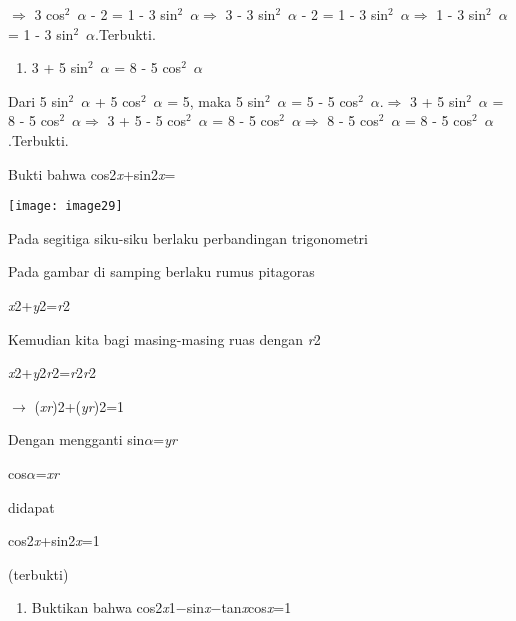 \documentclass[11pt,fleqn]{book} %
\begin{document}
\begin{myEnumerate}
\begin{itemize}
\noindent $\mathrm{\Rightarrow }$ 3 cos${}^{2}$~$\alpha$ - 2 = 1 - 3 sin${}^{2}$~$\alpha$$\mathrm{\Rightarrow }$ 3 - 3 sin${}^{2}$~$\alpha$ - 2 = 1 - 3 sin${}^{2}$~$\alpha$$\mathrm{\Rightarrow }$ 1 - 3 sin${}^{2}$~$\alpha$ = 1 - 3 sin${}^{2}$~$\alpha$.Terbukti.

\begin{enumerate}
\item  3 + 5 sin${}^{2}$~$\alpha$ = 8 - 5 cos${}^{2}$~$\alpha$
\end{enumerate}

\noindent Dari 5 sin${}^{2}$~$\alpha$ + 5 cos${}^{2}$~$\alpha$ = 5, maka 5 sin${}^{2}$~$\alpha$ = 5 - 5 cos${}^{2}$~$\alpha$.$\mathrm{\Rightarrow }$ 3 + 5 sin${}^{2}$~$\alpha$ = 8 - 5 cos${}^{2}$~$\alpha$$\mathrm{\Rightarrow }$ 3 + 5 - 5 cos${}^{2}$~$\alpha$ = 8 - 5 cos${}^{2}$~$\alpha$$\mathrm{\Rightarrow }$ 8 - 5 cos${}^{2}$~$\alpha$ = 8 - 5 cos${}^{2}$~$\alpha$.Terbukti.~

\noindent \textbf{}

\noindent Bukti bahwa cos2\textit{x}+sin2\textit{x}=


\noindent \texttt{[image: image29]}

\noindent Pada segitiga siku-siku berlaku perbandingan trigonometri 

\noindent Pada gambar di samping berlaku rumus pitagoras

\noindent \textit{x}2+\textit{y}2=\textit{r}2

\noindent Kemudian kita bagi masing-masing ruas dengan \textit{r}2

\noindent \textit{x}2+\textit{y}2\textit{r}2=\textit{r}2\textit{r}2

\noindent $\mathrm{\to}$ (\textit{xr})2+(\textit{yr})2=1

\noindent Dengan mengganti sin\textit{$\alpha$}=\textit{yr}

\noindent cos\textit{$\alpha$}=\textit{xr}

\noindent didapat

\noindent cos2\textit{x}+sin2\textit{x}=1

\noindent (terbukti) 

\noindent 

\noindent 

\noindent 

\begin{enumerate}
\item  Buktikan bahwa cos2\textit{x}1$\mathrm{-}$sin\textit{x}$\mathrm{-}$tan\textit{x}cos\textit{x}=1
\end{enumerate}


\end{itemize}
\end{myEnumerate}
\end{document}
